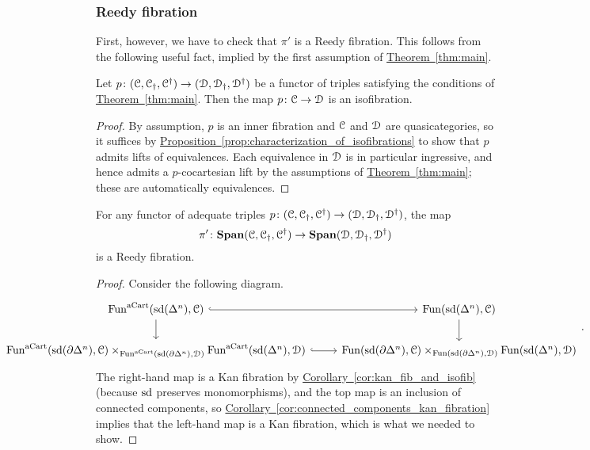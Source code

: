 \documentclass[main.tex]{subfiles}
\begin{document}
\subsubsection*{Reedy fibration}

First, however, we have to check that $\pi'$ is a Reedy fibration. This follows from the following useful fact, implied by the first assumption of \hyperref[thm:main]{Theorem~\ref*{thm:main}}.
\begin{lemma}
  Let $p\colon (\mathcal{C}, \mathcal{C}_{\dagger}, \mathcal{C}^{\dagger}) \to (\mathcal{D}, \mathcal{D}_{\dagger}, \mathcal{D}^{\dagger})$ be a functor of triples satisfying the conditions of \hyperref[thm:main]{Theorem~\ref*{thm:main}}. Then the map $p\colon \mathcal{C} \to \mathcal{D}$ is an isofibration.
\end{lemma}
\begin{proof}
  By assumption, $p$ is an inner fibration and $\mathcal{C}$ and $\mathcal{D}$ are quasicategories, so it suffices by \hyperref[prop:characterization_of_isofibrations]{Proposition~\ref*{prop:characterization_of_isofibrations}} to show that $p$ admits lifts of equivalences. Each equivalence in $\mathcal{D}$ is in particular ingressive, and hence admits a $p$-cocartesian lift by the assumptions of \hyperref[thm:main]{Theorem~\ref*{thm:main}}; these are automatically equivalences.
\end{proof}

\begin{proposition}
  For any functor of adequate triples $p\colon (\mathcal{C}, \mathcal{C}_{\dagger}, \mathcal{C}^{\dagger}) \to (\mathcal{D}, \mathcal{D}_{\dagger}, \mathcal{D}^{\dagger})$, the map
  \begin{equation*}
    \pi'\colon \mathbf{Span}(\mathcal{C}, \mathcal{C}_{\dagger}, \mathcal{C}^{\dagger}) \to \mathbf{Span}(\mathcal{D}, \mathcal{D}_{\dagger}, \mathcal{D}^{\dagger})
  \end{equation*}
  is a Reedy fibration.
\end{proposition}
\begin{proof}
  Consider the following diagram.
  \begin{equation*}
    \noindent\makebox[\textwidth]{%
      \begin{tikzcd}[ampersand replacement=\&]
        \Fun^{\aCart}(\sd(\Delta^{n}), \category{C})
        \arrow[r, hook]
        \arrow[d]
        \& \Fun(\sd(\Delta^{n}), \category{C})
        \arrow[d]
        \\
        \Fun^{\aCart}(\sd(\partial\Delta^{n}), \category{C})
        \times_{\Fun^{\aCart}(\sd(\partial\Delta^{n}), \category{D})}
        \Fun^{\aCart}(\sd(\Delta^{n}), \category{D})
        \arrow[r, hook]
        \& \Fun(\sd(\partial\Delta^{n}), \category{C})
        \times_{\Fun(\sd(\partial\Delta^{n}), \category{D})}
        \Fun(\sd(\Delta^{n}), \category{D})
      \end{tikzcd}.
    }
  \end{equation*}
  The right-hand map is a Kan fibration by \hyperref[cor:kan_fib_and_isofib]{Corollary~\ref*{cor:kan_fib_and_isofib}} (because $\mathrm{sd}$ preserves monomorphisms), and the top map is an inclusion of connected components, so \hyperref[cor:connected_components_kan_fibration]{Corollary~\ref*{cor:connected_components_kan_fibration}} implies that the left-hand map is a Kan fibration, which is what we needed to show.
\end{proof}
\end{document}
